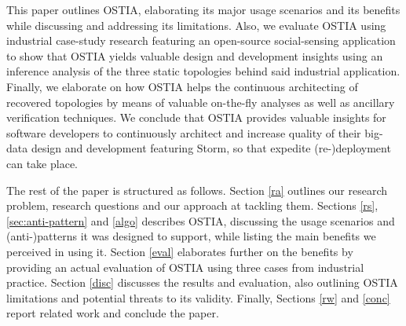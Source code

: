 This paper outlines OSTIA, elaborating its major usage scenarios and its benefits while discussing and addressing its limitations. Also, we evaluate OSTIA using industrial case-study research featuring an open-source social-sensing application to show that OSTIA yields valuable design and development insights using an inference analysis of the three static topologies behind said industrial application. Finally, we elaborate on how OSTIA helps the continuous architecting of recovered topologies by means of valuable on-the-fly analyses as well as ancillary verification techniques. We conclude that OSTIA provides valuable insights for software developers to continuously architect and increase quality of their big-data design and development featuring Storm, so that expedite (re-)deployment can take place.

The rest of the paper is structured as follows. Section \ref{ra} outlines our research problem, research questions and our approach at tackling them. Sections \ref{rs}, \ref{sec:anti-pattern} and \ref{algo} describes OSTIA, discussing the usage scenarios and (anti-)patterns it was designed to support, while listing the main benefits we perceived in using it. Section \ref{eval} elaborates further on the benefits by providing an actual evaluation of OSTIA using three cases from industrial practice. Section \ref{disc} discusses the results and evaluation, also outlining OSTIA limitations and potential threats to its validity. Finally, Sections \ref{rw} and \ref{conc} report related work and conclude the paper.
